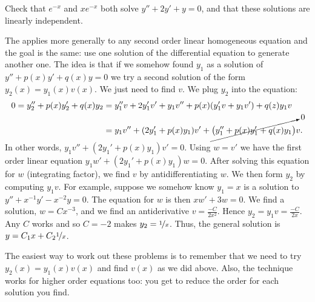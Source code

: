 \documentclass{ximera}
\begin{document}
\begin{exercise}
    Check that $e^{-x}$ and $xe^{-x}$ both solve $y'' + 2y' + y = 0$, and that these solutions are linearly independent.
\end{exercise}

The \emph{} applies more generally to any second order linear homogeneous equation and the goal is the same: use one solution of the differential equation to generate another one.  The idea is that if we somehow found $y_1$ as a solution of $y'' + p(x) y' + q(x) y = 0$ we try a second solution of the form $y_2(x) = y_1(x) v(x)$. We just need to find $v$.  We plug $y_2$ into the equation:
\begin{equation*}
    \begin{split}
        0 = y_2'' + p(x) y_2' + q(x) y_2 & = y_1'' v + 2 y_1' v' + y_1 v'' + p(x) ( y_1' v + y_1 v' ) + q(z) y_1 v \\
        & = y_1 v'' + (2 y_1' + p(x) y_1) v' + \cancelto{0}{\bigl( y_1'' + p(x) y_1' + q(x) y_1 \bigr)} v .
    \end{split}
\end{equation*}
In other words, $y_1 v'' + (2 y_1' + p(x) y_1) v' = 0$.  Using $w = v'$ we have the first order linear equation $y_1 w' + (2 y_1' + p(x) y_1) w = 0$.  After solving this equation for $w$ (integrating factor), we find $v$ by antidifferentiating $w$.  We then form $y_2$ by computing $y_1 v$.  For example, suppose we somehow know $y_1 = x$ is a solution to $y''+x^{-1}y'-x^{-2} y=0$. The equation for $w$ is then $xw' + 3 w = 0$.  We find a solution, $w = Cx^{-3}$, and we find an antiderivative $v = \frac{-C}{2x^2}$. Hence $y_2 = y_1 v = \frac{-C}{2x}$. Any $C$ works and so $C=-2$ makes $y_2 = \nicefrac{1}{x}$.  Thus, the general solution is $y = C_1 x + C_2\nicefrac{1}{x}$.

The easiest way to work out these problems is to remember that we need to try $y_2(x) = y_1(x) v(x)$ and find $v(x)$ as we did above.  Also, the technique works for higher order equations too: you get to reduce the order for each solution you find. 
\end{document}
